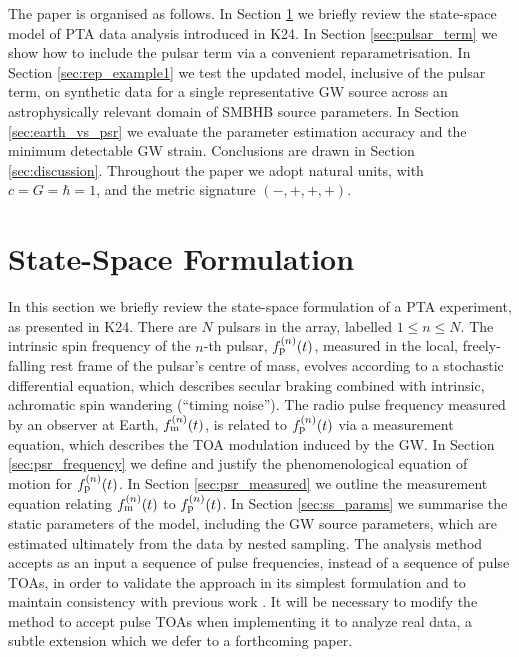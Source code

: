 \documentclass[fleqn,usenatbib,useAMS]{mnras}
\begin{document}
The paper is organised as follows. In Section \ref{sec:2} we briefly review the state-space model of PTA data analysis introduced in K24. In Section \ref{sec:pulsar_term} we show how to include the pulsar term via a convenient reparametrisation. In Section \ref{sec:rep_example1} we test the updated model, inclusive of the pulsar term, on synthetic data for a single representative GW source across an astrophysically relevant domain of SMBHB source parameters. In Section \ref{sec:earth_vs_psr} we evaluate the parameter estimation accuracy and the minimum detectable GW strain. Conclusions are drawn in Section \ref{sec:discussion}. Throughout the paper we adopt natural units, with $c = G = \hbar = 1$, and the metric signature $(-,+,+,+)$. \newline 




\section{State-Space Formulation}\label{sec:2}
In this section we briefly review the state-space formulation of a PTA experiment, as presented in K24. There are $N$ pulsars in the array, labelled $1\leq n\leq N$. The intrinsic spin frequency of the $n$-th pulsar, $f_{\rm p}^{(n)}(t)$, measured in the local, freely-falling rest frame of the pulsar's centre of mass, evolves according to a stochastic differential equation,  which describes secular braking combined with intrinsic, achromatic spin wandering (``timing noise''). The radio pulse frequency measured by an observer at Earth, $f_{\rm m}^{(n)}(t)$, is related to $f_{\rm p}^{(n)}(t)$ via a measurement equation, which describes the TOA modulation induced by the GW. In Section \ref{sec:psr_frequency} we define and justify the phenomenological equation of motion for $f_{\rm p}^{(n)}(t)$. In Section \ref{sec:psr_measured} we outline the measurement equation relating $f_{\rm m}^{(n)}(t)$ to $f_{\rm p}^{(n)}(t)$. In Section \ref{sec:ss_params} we summarise the static parameters of the model, including the GW source parameters, which are estimated ultimately from the data by nested sampling. The analysis method accepts as an input a sequence of pulse frequencies, instead of a sequence of pulse TOAs, in order to validate the approach in its simplest formulation and to maintain consistency with previous work \citep{Myers2021MNRAS.502.3113M,Meyers2021,KimpsonPTA}. It will be necessary to modify the method to accept pulse TOAs when implementing it to analyze real data, a subtle extension which we defer to a forthcoming paper. 
\end{document}
